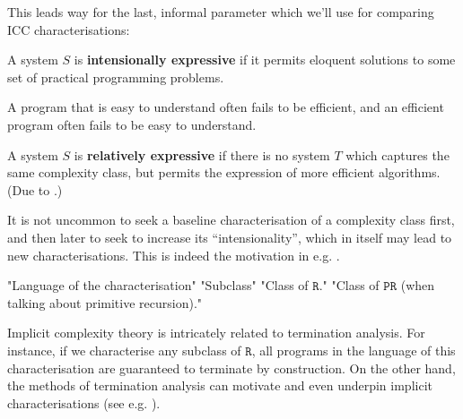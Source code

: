 
This leads way for the last, informal parameter which we'll use for comparing
ICC characterisations:


\begin{notion} A system $S$ is \textbf{intensionally expressive} if it permits
eloquent solutions to some set of practical programming problems.\end{notion}


A program that is easy to understand often fails to be efficient, and an
efficient program often fails to be easy to understand.

\begin{notion} A system $S$ is \textbf{relatively expressive} if there is no
system $T$ which captures the same complexity class, but permits the expression
of more efficient algorithms. (Due to \cite{jones-2001}.) \end{notion}

It is not uncommon to seek a baseline characterisation of a complexity class
first, and then later to seek to increase its ``intensionality'', which in
itself may lead to new characterisations. This is indeed the motivation in e.g.
\cite{hofmann-1999, marion-moyen-2000, niggl-2005, niggl-wunderlich-2006,
marion-pechoux-2008, jones-kristiansen-2009}.

"Language of the characterisation"
"Subclass"
"Class of $\mathtt{R}$."
"Class of $\mathtt{PR}$ (when talking about primitive recursion)."

Implicit complexity theory is intricately related to termination analysis. For
instance, if we characterise any subclass of $\mathtt{R}$, all programs in the
language of this characterisation are guaranteed to terminate by construction.
On the other hand, the methods of termination analysis can motivate and even
underpin implicit characterisations (see e.g.  \cite{marion-2003}).



